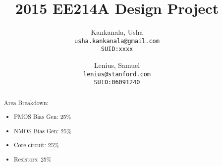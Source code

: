 \documentclass[12pt,english]{article}
\begin{document}




\author{
  Kankanala, Usha\\
  \texttt{usha.kankanala@gmail.com}\\
  \texttt{SUID:xxxx}
  \and
  Lenius, Samuel\\
  \texttt{lenius@stanford.com}\\
  \texttt{SUID:06091240}
}

\title{2015 EE214A Design Project}

\maketitle


\begin{abstract}
  Area Breakdown:
  \begin{addmargin}[1em]{0em}
  \begin{itemize}
    \item PMOS Bias Gen: 25\%
    \item NMOS Bias Gen: 25\%
    \item Core circuit: 25\%
    \item Resistors: 25\%
  \end{itemize}
  \end{addmargin}
\end{abstract}

\pagebreak

\end{document}
